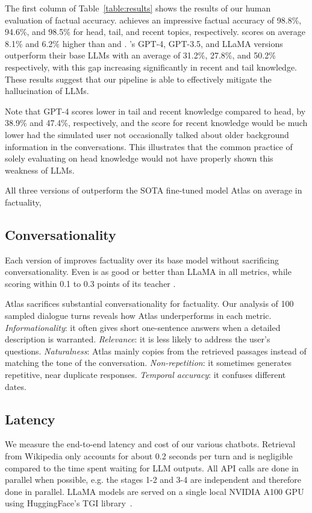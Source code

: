The first column of Table~\ref{table:results} shows the results of our human evaluation of factual accuracy. \systemgf achieves an impressive factual accuracy of 98.8\%, 94.6\%, and 98.5\% for head, tail, and recent topics, respectively. 
\systemgf scores on average 8.1\% and 6.2\% higher than \systemgt and \systeml. \system's GPT-4, GPT-3.5, and LLaMA versions
outperform their base LLMs with an average of 31.2\%, 27.8\%, and 50.2\% respectively, with this gap increasing significantly in recent and tail knowledge. 
These results suggest that our pipeline is able to effectively mitigate the hallucination of LLMs.

Note that GPT-4 scores lower in tail and recent knowledge compared to head, by 38.9\% and 47.4\%, respectively, and the score for recent knowledge would be much lower had the simulated user not occasionally talked about older background information in the conversations. This illustrates that the common practice of solely evaluating on head knowledge would not have properly shown this weakness of LLMs. 

All three versions of \system outperform the SOTA fine-tuned model Atlas on average in factuality,

\subsection{Conversationality}

Each version of \system improves factuality over its base model without sacrificing conversationality. Even \systeml is as good or better than LLaMA in all metrics, while scoring within 0.1 to 0.3 points of its teacher \systemgf.

Atlas sacrifices substantial conversationality for factuality.
Our analysis of 100 sampled dialogue turns reveals how Atlas underperforms in each metric. {\em Informationality}: it often gives short one-sentence answers when a detailed description is warranted. {\em Relevance}: it is less likely to address the user's questions. {\em Naturalness}: Atlas mainly copies from the retrieved passages instead of matching the tone of the conversation. {\em Non-repetition}: it sometimes generates repetitive, near duplicate responses. {\em Temporal accuracy}: it confuses different dates.

\subsection{Latency}
We measure the end-to-end latency and cost of our various chatbots. Retrieval from Wikipedia only accounts for about 0.2 seconds per turn and is negligible compared to the time spent waiting for LLM outputs. All API calls are done in parallel when possible, e.g. the stages 1-2 and 3-4 are independent and therefore done in parallel. LLaMA models are served on a single local NVIDIA A100 GPU using HuggingFace's TGI library~\cite{huggingface-tgi}.


